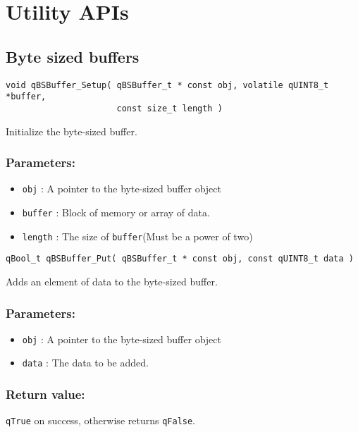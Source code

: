 \section{Utility APIs}

\subsection{Byte sized buffers}

\begin{lstlisting}[style=CStyle]
void qBSBuffer_Setup( qBSBuffer_t * const obj, volatile qUINT8_t *buffer, 
                      const size_t length )
\end{lstlisting}

Initialize the byte-sized buffer. 

\subsubsection*{Parameters:}
\begin{itemize}
    \item \lstinline{obj} : A pointer to the byte-sized buffer object
    \item \lstinline{buffer} : Block of memory or array of data.
    \item \lstinline{length} : The size of \lstinline{buffer}(Must be a power of two)
\end{itemize}

\noindent\hrulefill

\begin{lstlisting}[style=CStyle]
qBool_t qBSBuffer_Put( qBSBuffer_t * const obj, const qUINT8_t data )
\end{lstlisting}

Adds an element of data to the byte-sized buffer. 

\subsubsection*{Parameters:}
\begin{itemize}
    \item \lstinline{obj} : A pointer to the byte-sized buffer object
    \item \lstinline{data} : The data to be added.
\end{itemize}

\subsubsection*{Return value:}
\lstinline{qTrue} on success, otherwise returns \lstinline{qFalse}.


